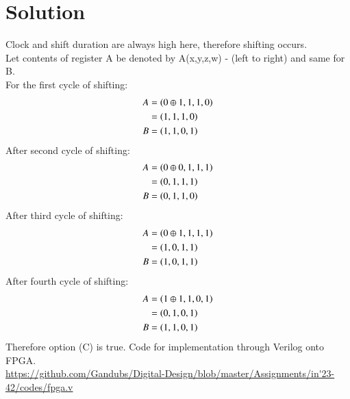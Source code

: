 \documentclass[journal,12pt,onecolumn]{IEEEtran}
\theoremstyle{remark}
\begin{document}
\section{Solution}
Clock and shift duration are always high here, therefore shifting occurs.\\
Let contents of register A be denoted by A(x,y,z,w) - (left to right) and same for B.\\
For the first cycle of shifting:
\begin{align}
A &= \left(0 \oplus 1,1,1,0\right)\\
   &= \left(1,1,1,0\right)\\
    B& =\left(1,1,0,1\right)
\end{align}
After second cycle of shifting:
\begin{align}
A &= \left(0 \oplus 0,1,1,1\right)\\
   &= \left(0,1,1,1\right)\\
    B& =\left(0,1,1,0\right)
\end{align}
After third cycle of shifting:
\begin{align}
A &= \left(0 \oplus 1,1,1,1\right)\\
   &= \left(1,0,1,1\right)\\
    B& =\left(1,0,1,1\right)
\end{align}
After fourth cycle of shifting:
\begin{align}
A &= \left(1 \oplus 1,1,0,1\right)\\
   &= \left(0,1,0,1\right)\\
    B& =\left(1,1,0,1\right)
\end{align}
Therefore option (C) is true.
Code for implementation through Verilog onto FPGA.\\
\url{https://github.com/Gandubs/Digital-Design/blob/master/Assignments/in'23-42/codes/fpga.v}
\end{document}
